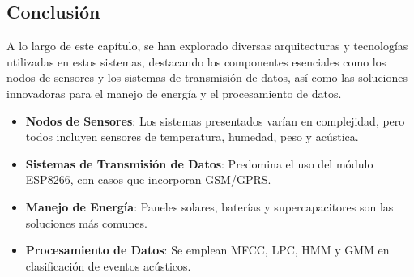 \subsection{Conclusión}
A lo largo de este capítulo, se han explorado diversas arquitecturas y tecnologías utilizadas en estos sistemas, destacando los componentes esenciales como los nodos de sensores y los sistemas de transmisión de datos, así como las soluciones innovadoras para el manejo de energía y el procesamiento de datos.
\begin{itemize}
    \item \textbf{Nodos de Sensores}: Los sistemas presentados varían en complejidad, pero todos incluyen sensores de temperatura, humedad, peso y acústica.
    \item \textbf{Sistemas de Transmisión de Datos}: Predomina el uso del módulo ESP8266, con casos que incorporan GSM/GPRS.
    \item \textbf{Manejo de Energía}: Paneles solares, baterías y supercapacitores son las soluciones más comunes.
    \item \textbf{Procesamiento de Datos}: Se emplean MFCC, LPC, HMM y GMM en clasificación de eventos acústicos.
\end{itemize}
